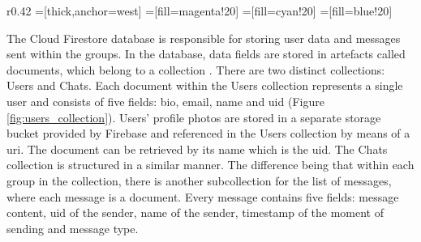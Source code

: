 \documentclass{article}
\begin{document}
    \begin{wrapfigure}{r}{0.42\textwidth}
     \vspace{-8pt}
        =[thick,anchor=west]
        =[fill=magenta!20]
        =[fill=cyan!20]
        =[fill=blue!20]
        
        \caption{The Users collection in the Cloud Firestore database}
        \label{fig:users_collection}
        \vspace{-8pt} %
     \end{wrapfigure}
     
    The Cloud Firestore database is responsible for storing user data and messages sent within the groups. In the database, data fields are stored in artefacts called documents, which belong to a collection \cite{firebaseDataModel}. There are two distinct collections: Users and Chats. Each document within the Users collection represents a single user and consists of five fields: \gls{bio}, email, name and \acrshort{uid} (Figure \ref{fig:users_collection}). Users' profile photos are stored in a separate storage \gls{bucket} provided by Firebase and referenced in the Users collection by means of a \acrshort{uri}. The document can be retrieved by its name which is the \acrshort{uid}. The Chats collection is structured in a similar manner. The difference being that within each group in the collection, there is another subcollection for the list of messages, where each message is a document. Every message contains five fields: message content, \acrshort{uid} of the sender, name of the sender, timestamp of the moment of sending and message type. \par
     
\end{document}
